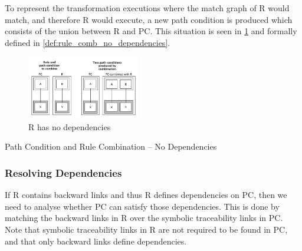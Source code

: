 To represent the transformation executions where the match graph of R would match, and therefore R would execute, a new path condition is produced which consists of the union between R and PC. This situation is
seen in \cref{fig:no_dependencies} and formally defined in \cref{def:rule_comb_no_dependencies}.

\begin{figure}[bt] \centering \includegraphics[width=0.44\textwidth]{./figures/building_path_conditions/no_dependencies.pdf}
	\caption{R has no dependencies}
	\label{fig:no_dependencies}
\end{figure}

% 

\begin{definition}{Path Condition and Rule Combination -- No Dependencies\\}
\label{def:rule_comb_no_dependencies}

\end{definition}


\subsubsection{Resolving Dependencies}
\label{subsubsec:resolve_dependencies}
If R contains backward links and thus R defines dependencies on PC, then we need to analyse whether PC can satisfy those dependencies. This is done by matching the backward links in R over the symbolic traceability links in PC. Note that symbolic traceability links in R are not required to be found in PC, and that only backward links define dependencies.

